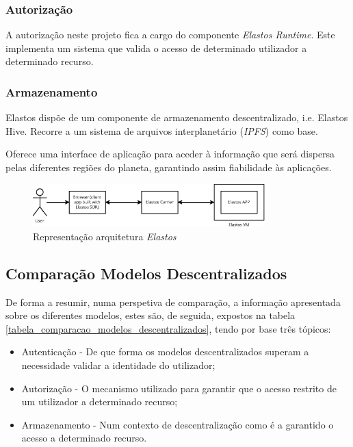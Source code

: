 \subsubsection{Autorização}
A autorização neste projeto fica a cargo do componente \emph{Elastos Runtime}. Este implementa um sistema que valida o acesso de determinado utilizador a determinado recurso\cite{elastos_white_paper}.

\subsubsection{Armazenamento}
Elastos dispõe de um componente de armazenamento descentralizado, i.e. Elastos Hive. Recorre a um sistema de arquivos interplanetário (\emph{IPFS}\label{sym:IPFS}) \cite{ipfs} como base. 

Oferece uma interface de aplicação para aceder à informação que será dispersa pelas diferentes regiões do planeta, garantindo assim fiabilidade às aplicações.\cite{elastos_white_paper}

\begin{figure}[H]
    \includegraphics[width=0.8\textwidth]{figures/estado_arte-Elastos.eps}
    \caption{Representação arquitetura \emph{Elastos}}
    \label{estado_arte_representacao_elastos}
\end{figure}

\subsection{Comparação Modelos Descentralizados}

De forma a resumir, numa perspetiva de comparação, a informação apresentada sobre os diferentes modelos, estes são, de seguida, expostos na  tabela \ref{tabela_comparacao_modelos_descentralizados}, tendo por base três tópicos:
\begin{itemize}
    \item Autenticação - De que forma os modelos descentralizados superam a necessidade validar a identidade do utilizador;
    \item Autorização - O mecanismo utilizado para garantir que o acesso restrito de um utilizador a determinado recurso;
    \item Armazenamento - Num contexto de descentralização como é a garantido o acesso a determinado recurso.
\end{itemize}

